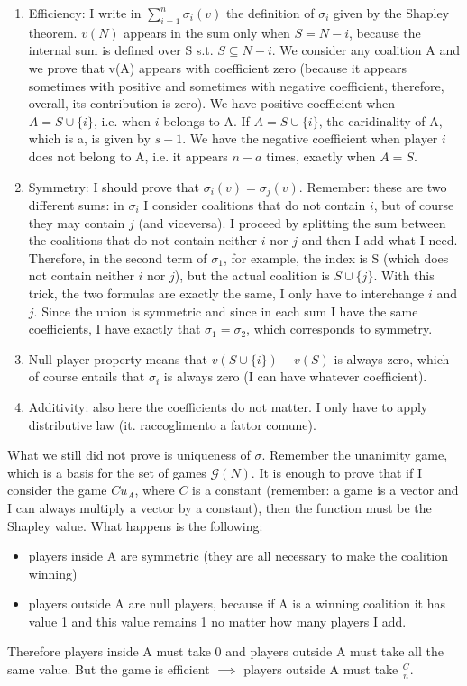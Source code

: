 \begin{enumerate}
	\item Efficiency: I write in $\sum_{i=1}^n{\sigma_i(v)}$ the definition 
	of $\sigma_i$ given by the Shapley theorem. $v(N)$ appears in the sum 
	only when $S = N - {i}$, because the internal sum is defined over S s.t. 
	$S \subseteq N - {i}$. 
	We consider any coalition A and we prove that v(A) appears with coefficient 
	zero (because it appears sometimes with positive and sometimes with negative 
	coefficient, therefore, overall, its contribution is zero). 
	We have positive coefficient when $A = S \cup \{i\}$, i.e. when $i$ belongs 
	to A. If $A = S \cup \{i\}$, the caridinality of A, which is a, is 
	given by $s-1$. 
	We have the negative coefficient when player $i$ does not belong to A, i.e. 
	it appears $n-a$ times, exactly when $A = S$.

	\item Symmetry: I should prove that $\sigma_i(v) = \sigma_j(v)$. 
	Remember: these are two different sums: in $\sigma_i$ I consider coalitions 
	that do not contain $i$, but of course they may contain $j$ (and viceversa). 
	I proceed by splitting the sum between the coalitions that do not contain 
	neither $i$ nor $j$ and then I add what I need. Therefore, in the second 
	term of $\sigma_1$, for example, the index is S (which does not contain 
	neither $i$ nor $j$), but the actual coalition is $S \cup \{j\}$. 
	With this trick, the two formulas are exactly the same, I only have to 
	interchange $i$ and $j$. Since the union is symmetric and since in each 
	sum I have the same coefficients, I have exactly that $\sigma_1 = \sigma_2$, 
	which corresponds to symmetry.

	\item Null player property means that $v(S \cup \{i\}) - v(S)$ is always 
	zero, which of course entails that $\sigma_i$ is always zero (I can have 
	whatever coefficient).

	\item Additivity: also here the coefficients do not matter. I only have to 
	apply distributive law (it. raccoglimento a fattor comune).
\end{enumerate}

\noindent What we still did not prove is uniqueness of $\sigma$. Remember the 
unanimity game, which is a basis for the set of games $\mathcal{G}(N)$. It is 
enough to prove that if I consider the game $Cu_A$, where $C$ is a constant 
(remember: a game is a vector and I can always multiply a vector by a 
constant), then the function must be the Shapley value. 
What happens is the following:
\begin{itemize}
	\item players inside A are symmetric (they are all necessary to make 
	the coalition winning)

	\item players outside A are null players, because if A is a winning 
	coalition it has value 1 and this value remains 1 no matter how many 
	players I add.
\end{itemize}
Therefore players inside A must take 0 and players outside A must take all the 
same value. But the game is efficient $\implies$ players outside A must take 
$\frac{C}{n}$.

